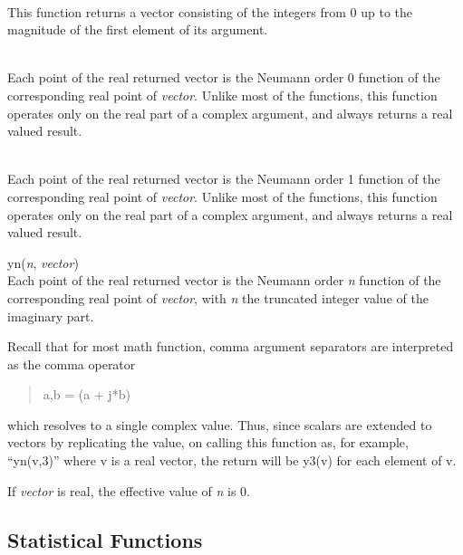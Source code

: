 \begin{description}
\item{}\\
This function returns a vector consisting of the integers from 0 up to the
magnitude of the first element of its argument.

\item{}\\
Each point of the real returned vector is the Neumann order 0 function
of the corresponding real point of {\it vector}.  Unlike most of the
functions, this function operates only on the real part of a complex
argument, and always returns a real valued result.

\item{}\\
Each point of the real returned vector is the Neumann order 1 function
of the corresponding real point of {\it vector}.  Unlike most of the
functions, this function operates only on the real part of a complex
argument, and always returns a real valued result.

\item{\vt yn}({\it n\/}, {\it vector\/})\\
Each point of the real returned vector is the Neumann order {\it n}
function of the corresponding real point of {\it vector}, with {\it n}
the truncated integer value of the imaginary part.

Recall that for most math function, comma argument separators
are interpreted as the comma operator
\begin{quote}
\vt a,b = (a + j*b)
\end{quote}
which resolves to a single complex value.  Thus, since scalars are
extended to vectors by replicating the value, on calling this function
as, for example, ``{\vt yn(v,3)}'' where {\vt v} is a real vector, the
return will be {\vt y3(v)} for each element of {\vt v}.

If {\it vector} is real, the effective value of {\it n} is 0.
\end{description}


\subsection{Statistical Functions}
\label{statfuncs}


